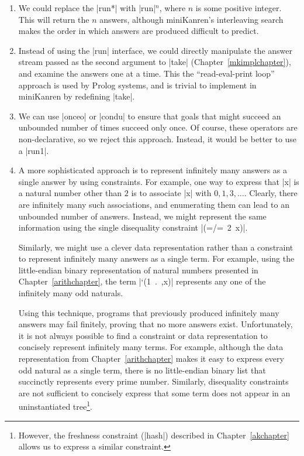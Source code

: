 \begin{enumerate}

\item We could replace the \scheme|run*| with \scheme|run|$^n$, where
$n$ is some positive integer.  This will return the $n$ answers,
although miniKanren's interleaving search makes the order in which
answers are produced difficult to predict.

\item Instead of using the \scheme|run| interface, we could directly
manipulate the answer stream passed as the second argument to
\scheme|take| (Chapter~\ref{mkimplchapter}), and examine the answers
one at a time.  This the ``read-eval-print loop'' approach is used by
Prolog systems, and is trivial to implement in miniKanren by redefining 
\scheme|take|.

\item We can use \scheme|onceo| or \scheme|condu| to ensure that goals
that might succeed an unbounded number of times succeed only once.  Of
course, these operators are non-declarative, so we reject this
approach.  Instead, it would be better to use a \scheme|run1|.

\item A more sophisticated approach is to represent infinitely many
answers as a single answer by using constraints.  For example, one way
to express that \scheme|x| is a natural number other than $2$ is to
associate \scheme|x| with $0, 1, 3, \ldots$.  Clearly, there are
infinitely many such associations, and enumerating them can lead to an
unbounded number of answers.  Instead, we might represent the same
information using the single disequality constraint \mbox{\scheme|(=/= 2 x)|}.

Similarly, we might use a clever data representation rather than a
constraint to represent infinitely many answers as a single term.  For
example, using the little-endian binary representation of natural
numbers presented in Chapter~\ref{arithchapter}, the term
\mbox{\scheme|`(1 . ,x)|} represents any one of the infinitely many
odd naturals.

Using this technique, programs that previously produced infinitely
many answers may fail finitely, proving that no more answers exist.
Unfortunately, it is not always possible to find a constraint or data
representation to concisely represent infinitely many terms.  For
example, although the data representation from
Chapter~\ref{arithchapter} makes it easy to express every odd natural
as a single term, there is no little-endian binary list that succinctly
represents every prime number.  Similarly, disequality constraints are
not sufficient to concisely express that some term does not appear in
an uninstantiated tree\footnote{However, the freshness
constraint (\scheme|hash|) described in Chapter~\ref{akchapter} allows
us to express a similar constraint.}.

\end{enumerate}



